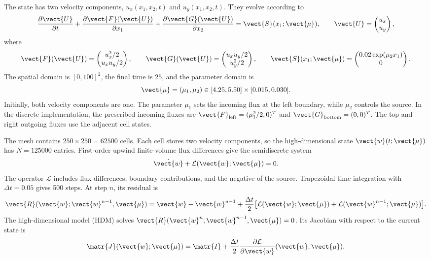 The state has two velocity components, $u_x(x_1,x_2,t)$ and $u_y(x_1,x_2,t)$. They evolve according to
\begin{equation}
 \frac{\partial \vect{U}}{\partial t}
 +\frac{\partial \vect{F}(\vect{U})}{\partial x_1}
 +\frac{\partial \vect{G}(\vect{U})}{\partial x_2}=\vect{S}(x_1;\vect{\mu}),
 \qquad \vect{U}=\begin{pmatrix}u_x\\u_y\end{pmatrix},
 \label{eq:impl-pde}
\end{equation}
where
\begin{equation}
 \vect{F}(\vect{U})=\begin{pmatrix}u_x^2/2\\u_xu_y/2\end{pmatrix},\qquad
 \vect{G}(\vect{U})=\begin{pmatrix}u_xu_y/2\\u_y^2/2\end{pmatrix},\qquad
 \vect{S}(x_1;\vect{\mu})=\begin{pmatrix}0.02\exp(\mu_2x_1)\\0\end{pmatrix}.
 \label{eq:impl-fluxes}
\end{equation}
The spatial domain is $[0,100]^2$, the final time is $25$, and the parameter domain is
\begin{equation}
 \vect{\mu}=(\mu_1,\mu_2)\in[4.25,5.50]\times[0.015,0.030].
\end{equation}
Initially, both velocity components are one. The parameter $\mu_1$ sets the incoming flux at the left boundary, while $\mu_2$ controls the source. In the discrete implementation, the prescribed incoming fluxes are $\vect{F}_{\mathrm{left}}=(\mu_1^2/2,0)^T$ and $\vect{G}_{\mathrm{bottom}}=(0,0)^T$. The top and right outgoing fluxes use the adjacent cell states.

The mesh contains $250\times250=62500$ cells. Each cell stores two velocity components, so the high-dimensional state $\vect{w}(t;\vect{\mu})$ has $N=125000$ entries. First-order upwind finite-volume flux differences give the semidiscrete system
\begin{equation}
 \dot{\vect{w}}+\mathcal L(\vect{w};\vect{\mu})=0.
 \label{eq:impl-hdm}
\end{equation}
The operator $\mathcal L$ includes flux differences, boundary contributions, and the negative of the source. Trapezoidal time integration with $\Delta t=0.05$ gives 500 steps. At step $n$, its residual is
\begin{equation}
 \vect{R}(\vect{w};\vect{w}^{n-1},\vect{\mu})=\vect{w}-\vect{w}^{n-1}
 +\frac{\Delta t}{2}\big[\mathcal L(\vect{w};\vect{\mu})+\mathcal L(\vect{w}^{n-1};\vect{\mu})\big].
 \label{eq:impl-residual}
\end{equation}
The high-dimensional model (HDM) solves $\vect{R}(\vect{w}^n;\vect{w}^{n-1},\vect{\mu})=0$. Its Jacobian with respect to the current state is
\begin{equation}
 \matr{J}(\vect{w};\vect{\mu})=\matr{I}+\frac{\Delta t}{2}\frac{\partial\mathcal L}{\partial \vect{w}}(\vect{w};\vect{\mu}).
 \label{eq:impl-jacobian}
\end{equation}

